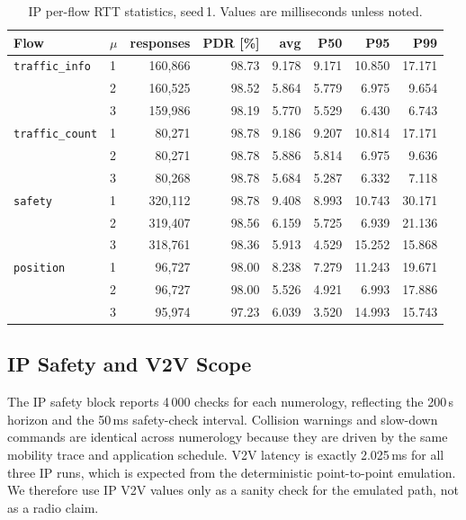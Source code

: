 \documentclass[journal]{IEEEtran}
\newcommand{\micro}{$\mu$}
\newcommand{\code}[1]{\texttt{\small #1}}
\begin{document}
\begin{table}[!t]\centering
\caption{IP per-flow RTT statistics, seed\,1. Values are milliseconds unless noted.}
\label{tab:ipflows}
\footnotesize
\begin{tabular}{@{}llrrrrrr@{}}
\toprule
Flow & \micro & responses & PDR [\%] & avg & P50 & P95 & P99\\
\midrule
\code{traffic\_info} & 1 & 160,866 & 98.73 & 9.178 & 9.171 & 10.850 & 17.171\\
                     & 2 & 160,525 & 98.52 & 5.864 & 5.779 & 6.975 & 9.654\\
                     & 3 & 159,986 & 98.19 & 5.770 & 5.529 & 6.430 & 6.743\\
\code{traffic\_count}& 1 & 80,271  & 98.78 & 9.186 & 9.207 & 10.814 & 17.171\\
                     & 2 & 80,271  & 98.78 & 5.886 & 5.814 & 6.975 & 9.636\\
                     & 3 & 80,268  & 98.78 & 5.684 & 5.287 & 6.332 & 7.118\\
\code{safety}        & 1 & 320,112 & 98.78 & 9.408 & 8.993 & 10.743 & 30.171\\
                     & 2 & 319,407 & 98.56 & 6.159 & 5.725 & 6.939 & 21.136\\
                     & 3 & 318,761 & 98.36 & 5.913 & 4.529 & 15.252 & 15.868\\
\code{position}      & 1 & 96,727  & 98.00 & 8.238 & 7.279 & 11.243 & 19.671\\
                     & 2 & 96,727  & 98.00 & 5.526 & 4.921 & 6.993 & 17.886\\
                     & 3 & 95,974  & 97.23 & 6.039 & 3.520 & 14.993 & 15.743\\
\bottomrule
\end{tabular}
\end{table}

\subsection{IP Safety and V2V Scope}

The IP safety block reports 4\,000 checks for each numerology, reflecting the 200\,s horizon and the 50\,ms safety-check interval. Collision warnings and slow-down commands are identical across numerology because they are driven by the same mobility trace and application schedule. V2V latency is exactly 2.025\,ms for all three IP runs, which is expected from the deterministic point-to-point emulation. We therefore use IP V2V values only as a sanity check for the emulated path, not as a radio claim.
\end{document}
